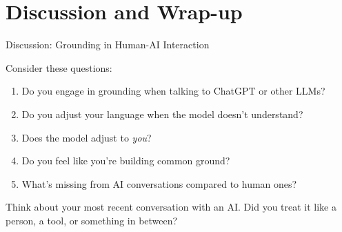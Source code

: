 \documentclass[aspectratio=169]{beamer}
\begin{document}
\section{Discussion and Wrap-up}

\begin{frame}{Discussion: Grounding in Human-AI Interaction 🤔}
\small
    \begin{discussion}
        Consider these questions:

        \begin{enumerate}\setlength{\itemsep}{0pt}
            \item Do you engage in grounding when talking to ChatGPT or other LLMs?
            \item Do you adjust your language when the model doesn't understand?
            \item Does the model adjust to \textit{you}?
            \item Do you feel like you're building common ground?
            \item What's missing from AI conversations compared to human ones?
        \end{enumerate}
    \end{discussion}

    \vspace{0.3cm}

    \begin{thinkaboutit}
        Think about your most recent conversation with an AI. Did you treat it like a person, a tool, or something in between?
    \end{thinkaboutit}
\end{frame}
\end{document}
